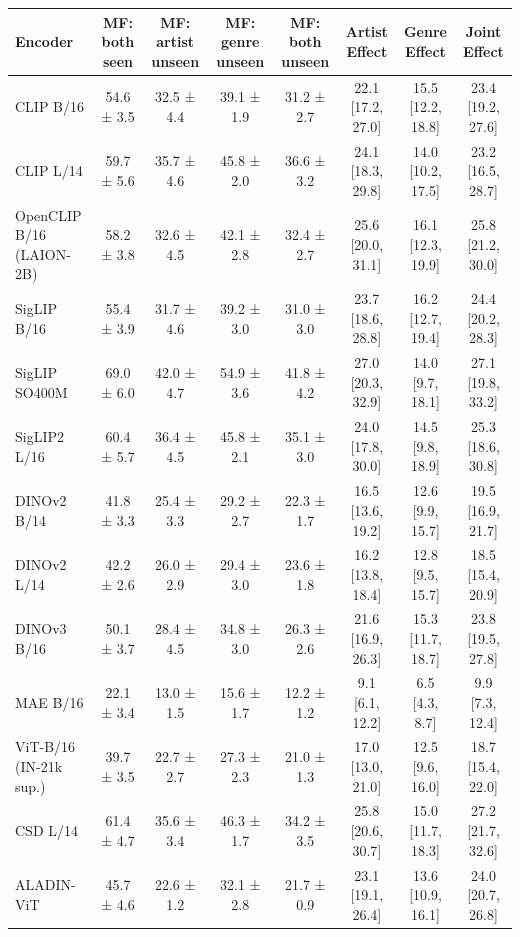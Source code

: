 \begin{tabular}{lccccccc}
\toprule
Encoder & MF: both seen & MF: artist unseen & MF: genre unseen & MF: both unseen & Artist Effect & Genre Effect & Joint Effect \\
\midrule
CLIP B/16 & 54.6 ± 3.5 & 32.5 ± 4.4 & 39.1 ± 1.9 & 31.2 ± 2.7 & 22.1 [17.2, 27.0] & 15.5 [12.2, 18.8] & 23.4 [19.2, 27.6] \\
CLIP L/14 & 59.7 ± 5.6 & 35.7 ± 4.6 & 45.8 ± 2.0 & 36.6 ± 3.2 & 24.1 [18.3, 29.8] & 14.0 [10.2, 17.5] & 23.2 [16.5, 28.7] \\
OpenCLIP B/16 (LAION-2B) & 58.2 ± 3.8 & 32.6 ± 4.5 & 42.1 ± 2.8 & 32.4 ± 2.7 & 25.6 [20.0, 31.1] & 16.1 [12.3, 19.9] & 25.8 [21.2, 30.0] \\
SigLIP B/16 & 55.4 ± 3.9 & 31.7 ± 4.6 & 39.2 ± 3.0 & 31.0 ± 3.0 & 23.7 [18.6, 28.8] & 16.2 [12.7, 19.4] & 24.4 [20.2, 28.3] \\
SigLIP SO400M & 69.0 ± 6.0 & 42.0 ± 4.7 & 54.9 ± 3.6 & 41.8 ± 4.2 & 27.0 [20.3, 32.9] & 14.0 [9.7, 18.1] & 27.1 [19.8, 33.2] \\
SigLIP2 L/16 & 60.4 ± 5.7 & 36.4 ± 4.5 & 45.8 ± 2.1 & 35.1 ± 3.0 & 24.0 [17.8, 30.0] & 14.5 [9.8, 18.9] & 25.3 [18.6, 30.8] \\
DINOv2 B/14 & 41.8 ± 3.3 & 25.4 ± 3.3 & 29.2 ± 2.7 & 22.3 ± 1.7 & 16.5 [13.6, 19.2] & 12.6 [9.9, 15.7] & 19.5 [16.9, 21.7] \\
DINOv2 L/14 & 42.2 ± 2.6 & 26.0 ± 2.9 & 29.4 ± 3.0 & 23.6 ± 1.8 & 16.2 [13.8, 18.4] & 12.8 [9.5, 15.7] & 18.5 [15.4, 20.9] \\
DINOv3 B/16 & 50.1 ± 3.7 & 28.4 ± 4.5 & 34.8 ± 3.0 & 26.3 ± 2.6 & 21.6 [16.9, 26.3] & 15.3 [11.7, 18.7] & 23.8 [19.5, 27.8] \\
MAE B/16 & 22.1 ± 3.4 & 13.0 ± 1.5 & 15.6 ± 1.7 & 12.2 ± 1.2 & 9.1 [6.1, 12.2] & 6.5 [4.3, 8.7] & 9.9 [7.3, 12.4] \\
ViT-B/16 (IN-21k sup.) & 39.7 ± 3.5 & 22.7 ± 2.7 & 27.3 ± 2.3 & 21.0 ± 1.3 & 17.0 [13.0, 21.0] & 12.5 [9.6, 16.0] & 18.7 [15.4, 22.0] \\
CSD L/14 & 61.4 ± 4.7 & 35.6 ± 3.4 & 46.3 ± 1.7 & 34.2 ± 3.5 & 25.8 [20.6, 30.7] & 15.0 [11.7, 18.3] & 27.2 [21.7, 32.6] \\
ALADIN-ViT & 45.7 ± 4.6 & 22.6 ± 1.2 & 32.1 ± 2.8 & 21.7 ± 0.9 & 23.1 [19.1, 26.4] & 13.6 [10.9, 16.1] & 24.0 [20.7, 26.8] \\
\bottomrule
\end{tabular}
